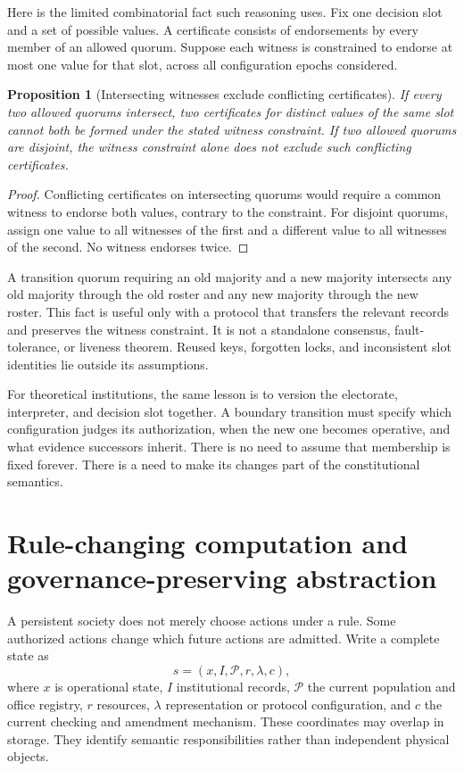 \documentclass[11pt,letterpaper]{article}
\theoremstyle{plain}
\newtheorem{proposition}{Proposition}[section]
\theoremstyle{definition}
\theoremstyle{remark}
\begin{document}
Here is the limited combinatorial fact such reasoning uses. Fix one decision slot and a set of possible values. A certificate consists of endorsements by every member of an allowed quorum. Suppose each witness is constrained to endorse at most one value for that slot, across all configuration epochs considered.
\begin{proposition}[Intersecting witnesses exclude conflicting certificates]\label{prop:handover}
If every two allowed quorums intersect, two certificates for distinct values of the same slot cannot both be formed under the stated witness constraint. If two allowed quorums are disjoint, the witness constraint alone does not exclude such conflicting certificates.
\end{proposition}
\begin{proof}
Conflicting certificates on intersecting quorums would require a common witness to endorse both values, contrary to the constraint. For disjoint quorums, assign one value to all witnesses of the first and a different value to all witnesses of the second. No witness endorses twice.
\end{proof}

A transition quorum requiring an old majority and a new majority intersects any old majority through the old roster and any new majority through the new roster. This fact is useful only with a protocol that transfers the relevant records and preserves the witness constraint. It is not a standalone consensus, fault-tolerance, or liveness theorem. Reused keys, forgotten locks, and inconsistent slot identities lie outside its assumptions.

For theoretical institutions, the same lesson is to version the electorate, interpreter, and decision slot together. A boundary transition must specify which configuration judges its authorization, when the new one becomes operative, and what evidence successors inherit. There is no need to assume that membership is fixed forever. There is a need to make its changes part of the constitutional semantics.

\section{Rule-changing computation and governance-preserving abstraction}\label{sec:governance}
A persistent society does not merely choose actions under a rule. Some authorized actions change which future actions are admitted. Write a complete state as
\[
s=(x,I,\mathcal P,r,\lambda,c),
\]
where $x$ is operational state, $I$ institutional records, $\mathcal P$ the current population and office registry, $r$ resources, $\lambda$ representation or protocol configuration, and $c$ the current checking and amendment mechanism. These coordinates may overlap in storage. They identify semantic responsibilities rather than independent physical objects.
\end{document}
